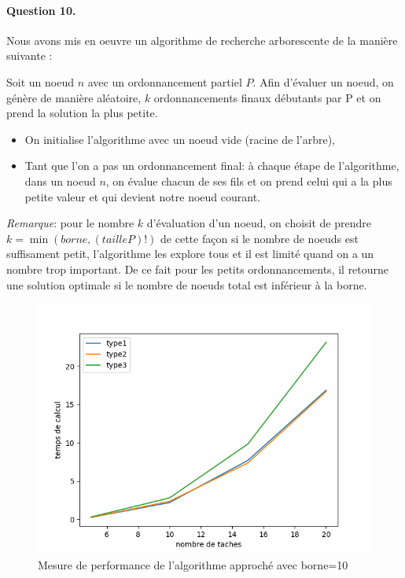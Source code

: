 \documentclass[a4paper, 10pt]{article}
\begin{document}
         \paragraph{Question 10.}{Nous avons mis en oeuvre un algorithme de recherche arborescente de la manière suivante :
         
Soit un noeud $n$ avec un ordonnancement partiel $P$. Afin d'évaluer un noeud, on génère de manière aléatoire, $k$ ordonnancements finaux débutants par P et on prend la solution la plus petite.
	\begin{itemize}
    		\item On initialise l'algorithme avec un noeud vide (racine de l'arbre),
        \item Tant que l'on a pas un ordonnancement final: à chaque étape de l'algorithme, dans un noeud $n$, on évalue chacun de ses fils et on prend celui qui a la plus petite valeur et qui devient notre noeud courant.
    \end{itemize}
    
    
\emph{Remarque}: pour le nombre $k$ d'évaluation d'un noeud, on choisit de prendre $k = \min(borne,(taille P)!)$ de cette façon si le nombre de noeuds est suffisament petit, l'algorithme les explore tous et il est limité quand on a un nombre trop important. De ce fait pour les petits ordonnancements, il retourne une solution optimale si le nombre de noeuds total est inférieur à la borne.

    \begin{figure}[H]
		\centering
		\includegraphics[width=0.85\linewidth]{graphes/branch_and_greed.png}
		\caption{Mesure de performance de l'algorithme approché avec borne=10}
		\label{fig:bag}
	\end{figure}
}
	
\end{document}
